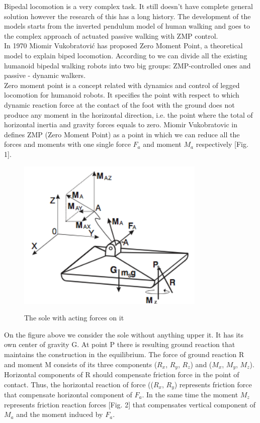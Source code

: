 \documentclass[11pt,a4paper]{article}
\begin{document}
Bipedal locomotion is a very complex task. It still doesn't have complete general solution however the research of this has a long history. The development of the models starts from the inverted pendulum model of human walking and goes to the complex approach of actuated passive walking with ZMP control.\\
In 1970 Miomir Vukobratović has proposed Zero Moment Point, a theoretical model to explain biped locomotion.
According to \cite{manchester2011stable} we can divide all the existing humanoid bipedal walking robots into two big groups: ZMP-controlled ones and passive - dynamic walkers.\\
Zero moment point is a concept related with dynamics and control of legged locomotion for humanoid robots. It specifies the point with respect to which dynamic reaction force at the contact of the foot with the ground does not produce any moment in the horizontal direction, i.e. the point where the total of horizontal inertia and gravity forces equals to zero.
Miomir Vukobratovic in \cite{vukobratovic2004zero} defines ZMP (Zero Moment Point) as a point in which we can reduce all the forces and moments with one single force $F_a$ and moment $M_a$ respectively  [Fig. 1].
	
	\begin{figure}[h!]
		\vspace{-0.2cm}
		\centering
		{\includegraphics[width=0.8\textwidth]{1}}
		\caption{The sole with acting forces on it}
		\label{fig:example2}
		\vspace{-0.1cm}
	\end{figure}

On the figure above we consider the sole without anything upper it. It has its own center of gravity G. At point P there is resulting ground reaction that maintains the construction in the equilibrium. The force of ground reaction R and moment M consists of its three components ($R_x$, $R_y$, $R_z$) and ($M_x$, $M_y$, $M_z$). Horizontal components of R should compensate friction force in the point of contact. Thus, the horizontal reaction of force (($R_x$, $R_y$) represents 
friction force that compensate horizontal component of $F_a$. In the same time the moment $M_z$ represents friction reaction forces [Fig. 2] that compensates vertical component of $M_a$ and the moment induced by $F_a$. \cite{vukobratovic2004zero}
\end{document}
